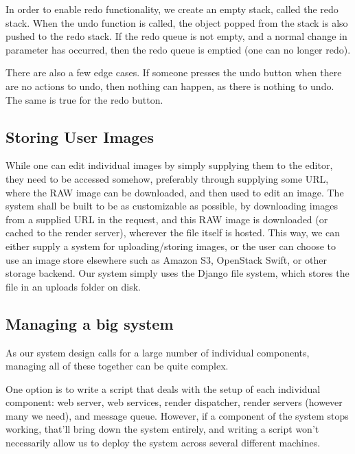 \documentclass[10pt,a4paper]{article}
\begin{document}
In order to enable redo functionality, we create an empty stack, called the redo stack. When the undo function is called,
the object popped from the stack is also pushed to the redo stack. If the redo queue is not empty, and a normal change in parameter
has occurred, then the redo queue is emptied (one can no longer redo).

There are also a few edge cases. If someone presses the undo button when there are no actions to undo, then nothing can happen,
as there is nothing to undo. The same is true for the redo button.


\subsection{Storing User Images}
While one can edit individual images by simply supplying them to the editor, they need to be accessed somehow,
preferably through supplying some URL, where the RAW image can be downloaded, and then used to edit an image.
The system shall be built to be as customizable as possible, by downloading images from a supplied URL in the request,
and this RAW image is downloaded (or cached to the render server), wherever the file itself is hosted. This way, we can
either supply a system for uploading/storing images, or the user can choose to use an image store elsewhere such as Amazon
S3, OpenStack Swift, or other storage backend. Our system simply uses the Django file system, which stores the file in an
uploads folder on disk.



\subsection{Managing a big system}
As our system design calls for a large number of individual components, managing all of these together can be quite complex.

One option is to write a script that deals with the setup of each individual component: web server, web services, render dispatcher, render servers (however many we need),
and message queue. However, if a component of the system stops working, that'll bring down the system entirely, and writing a script won't necessarily allow us to deploy the system
across several different machines.
\end{document}

